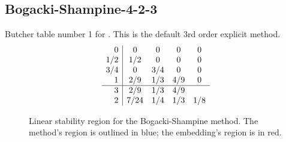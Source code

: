 \documentclass[letterpaper,10pt,english]{sphinxmanual}
\begin{document}
\subsection{Bogacki-Shampine-4-2-3}
\label{Butcher:bogacki-shampine-4-2-3}\label{Butcher:butcher-bogacki-shampine}
Butcher table number 1
for {\hyperref[c_interface/User_callable:c.ARKodeSetERKTableNum]{\emph{}}}.  This is
the default 3rd order explicit method.
\begin{gather}
\begin{split}\begin{array}{r|cccc}
  0 &   0 & 0 & 0 & 0 \\
  1/2 & 1/2 & 0 & 0 & 0 \\
  3/4 & 0 & 3/4 & 0 & 0 \\
  1   & 2/9 & 1/3 & 4/9 & 0 \\
  \hline
  3 & 2/9 & 1/3 & 4/9 \\
  2 & 7/24 & 1/4 & 1/3 & 1/8
\end{array}\end{split}\notag
\end{gather}\begin{figure}[htbp]
\centering
\capstart

\caption{Linear stability region for the Bogacki-Shampine method.  The method's
region is outlined in blue; the embedding's region is in red.}\end{figure}
\end{document}
